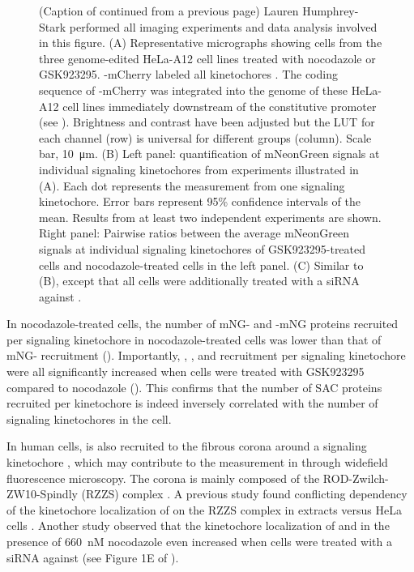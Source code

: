 \begin{figure}
    \noindent\justifying (Caption of  continued from a previous page) Lauren Humphrey-Stark performed all imaging experiments and data analysis involved in this figure. (A) Representative micrographs showing cells from the three genome-edited HeLa-A12 cell lines treated with nocodazole or GSK923295. -mCherry labeled all kinetochores \cite{Kukreja2020}. The coding sequence of -mCherry was integrated into the genome of these HeLa-A12 cell lines immediately downstream of the constitutive  promoter (see ). Brightness and contrast have been adjusted but the LUT for each channel (row) is universal for different groups (column). Scale bar, \SI{10}{\micro m}. (B) Left panel: quantification of mNeonGreen signals at individual signaling kinetochores from experiments illustrated in (A). Each dot represents the measurement from one signaling kinetochore. Error bars represent 95\% confidence intervals of the mean. Results from at least two independent experiments are shown. Right panel: Pairwise ratios between the average mNeonGreen signals at individual signaling kinetochores of GSK923295-treated cells and nocodazole-treated cells in the left panel. (C) Similar to (B), except that all cells were additionally treated with a siRNA against .
\end{figure}

In nocodazole-treated cells, the number of mNG- and -mNG proteins recruited per signaling kinetochore in nocodazole-treated cells was lower than that of mNG- recruitment (). Importantly, , , and  recruitment per signaling kinetochore were all significantly increased when cells were treated with GSK923295 compared to nocodazole (). This confirms that the number of SAC proteins recruited per kinetochore is indeed inversely correlated with the number of signaling kinetochores in the cell.

In human cells,  is also recruited to the fibrous corona around a signaling kinetochore \cite{RZZ-MAD1vsBUB1-MAD1_2015, RZZ-MAD1vsBUB1-MAD1_2018}, which may contribute to the measurement in  through widefield fluorescence microscopy. The corona is mainly composed of the ROD-Zwilch-ZW10-Spindly (RZZS) complex \cite{RZZS_Sacristan2018, RZZS_Raisch2022}. A previous study found conflicting dependency of the kinetochore localization of  on the RZZS complex in  extracts versus HeLa cells \cite{BUBR1_XenopusVSHeLa}. Another study observed that the kinetochore localization of  and  in the presence of \SI{660}{nM} nocodazole even increased when cells were treated with a siRNA against  (see Figure 1E of \cite{siROD_Zhang2019}).

